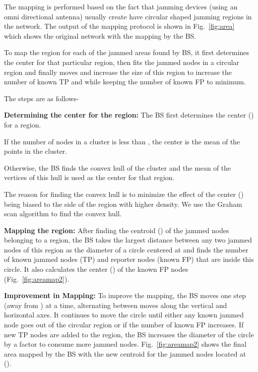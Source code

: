 \documentclass[conference]{IEEEtran}
\begin{document}
The mapping is performed based on the fact that jamming devices (using an omni directional antenna) usually create have circular shaped jamming regions in the network. The output of the mapping protocol is shown in Fig.~\ref{fig:area} which shows the original network with the mapping by the BS.

To map the region for each of the jammed areas found by BS, it first determines the center for that particular region, then fits the jammed nodes in a circular region and finally moves and increase the size of this region to increase the number of known TP and while keeping the number of known FP to minimum.

The steps are as follows-

\begin{list}{}{\leftmargin=1em}
\item
{\bf Determining the center for the region:} The BS first determines the center () for a region.


If the number of nodes in a cluster is less than , the center is the mean of the points in the cluster.

Otherwise, the BS finds the convex hull of the cluster and the mean of the vertices of this hull is used as the center for that region.


The reason for finding the convex hull is to minimize the effect of the center () being biased to the side of the region with higher density. We use the Graham scan algorithm to find the convex hull. 

\item
{\bf Mapping the region:}
After finding the centroid () of the jammed nodes belonging to a region, the BS takes the largest distance between any two jammed nodes of this region as the diameter of a circle centered at  and finds the number of known jammed nodes (TP) and reporter nodes (known FP) that are inside this circle. It also calculates the center () of the known FP nodes (Fig.~\ref{fig:areamap2}). 


\item
{\bf Improvement in Mapping:}
To improve the mapping, the BS moves  one step (away from ) at a time, alternating between moves along the vertical and horizontal axes. It continues to move the circle until either any known jammed node goes out of the circular region or if the number of known FP increases. If new TP nodes are added to the region, the BS increases the diameter of the circle by a factor to consume more jammed nodes. Fig.~\ref{fig:areamap2} shows the final area mapped by the BS with the new centroid for the jammed nodes located at ().


\end{list}
\end{document}

